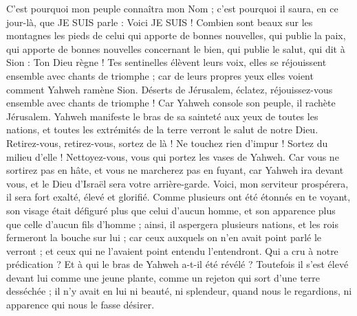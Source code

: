 \begin{multicols}{2}
C'est pourquoi mon peuple connaîtra mon Nom ; c'est pourquoi il saura, en ce jour-là, que JE SUIS parle : Voici JE SUIS !
Combien sont beaux sur les montagnes les pieds de celui qui apporte de bonnes nouvelles, qui publie la paix, qui apporte de bonnes nouvelles concernant le bien, qui publie le salut, qui dit à Sion : Ton Dieu règne !
Tes sentinelles élèvent leurs voix, elles se réjouissent ensemble avec chants de triomphe ; car de leurs propres yeux elles voient comment Yahweh ramène Sion.
Déserts de Jérusalem, éclatez, réjouissez-vous ensemble avec chants de triomphe ! Car Yahweh console son peuple, il rachète Jérusalem.
Yahweh manifeste le bras de sa sainteté aux yeux de toutes les nations, et toutes les extrémités de la terre verront le salut de notre Dieu.
Retirez-vous, retirez-vous, sortez de là ! Ne touchez rien d'impur ! Sortez du milieu d'elle ! Nettoyez-vous, vous qui portez les vases de Yahweh.
Car vous ne sortirez pas en hâte, et vous ne marcherez pas en fuyant, car Yahweh ira devant vous, et le Dieu d'Israël sera votre arrière-garde.
Voici, mon serviteur prospérera, il sera fort exalté, élevé et glorifié.
Comme plusieurs ont été étonnés en te voyant, son visage était défiguré plus que celui d'aucun homme, et son apparence plus que celle d'aucun fils d'homme ;
ainsi, il aspergera plusieurs nations, et les rois fermeront la bouche sur lui ; car ceux auxquels on n'en avait point parlé le verront ; et ceux qui ne l'avaient point entendu l'entendront.
\VerseOne{}Qui a cru à notre prédication ? Et à qui le bras de Yahweh a-t-il été révélé ?
Toutefois il s'est élevé devant lui comme une jeune plante, comme un rejeton qui sort d'une terre desséchée ; il n'y avait en lui ni beauté, ni splendeur, quand nous le regardions, ni apparence qui nous le fasse désirer.

\end{multicols}
